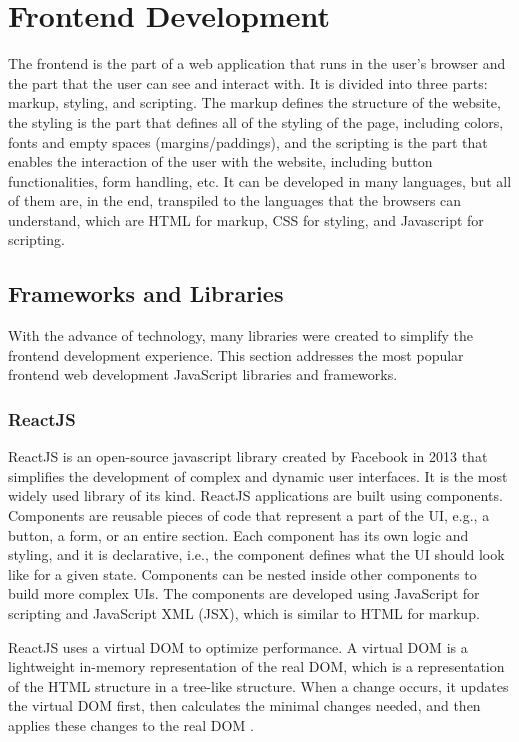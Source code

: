 \section{Frontend Development}
The frontend is the part of a web application that runs in the user's browser and
the part that the user can see and interact with. It is divided into three
parts: markup, styling, and scripting.
The markup defines the structure of the website, the styling is the part that
defines all of the styling of the page, including colors, fonts and empty spaces
(margins/paddings), and the scripting is the part that enables the interaction
of the user with the website, including button functionalities, form handling,
etc.
It can be developed in many languages, but all of them are, in the end, transpiled
to the languages that the browsers can understand, which are \gls{HTML} for
markup, \gls{CSS} for styling, and Javascript for scripting.

\subsection{Frameworks and Libraries}
With the advance of technology, many libraries were created to simplify the
frontend development experience. This section addresses the most popular
frontend web development JavaScript libraries and frameworks.
\subsubsection{ReactJS}
ReactJS is an open-source javascript library created by Facebook in 2013 that
simplifies the development of complex and dynamic user interfaces. It is the most widely
used library of its kind.
ReactJS applications are built using components. Components are reusable pieces of
code that represent a part of the \gls{UI}, e.g., a button, a form, or an entire section.
Each component has its own logic and styling, and it is declarative, i.e., the
component defines what the \gls{UI} should look like for a given state.
Components can be nested inside other components to build more complex \gls{UI}s.
The components are developed using JavaScript for scripting and JavaScript \gls{XML} (\gls{JSX}),
which is similar to \gls{HTML} for markup.

ReactJS uses a virtual \gls{DOM} to optimize performance. A virtual
\gls{DOM} is a lightweight in-memory representation of the real \gls{DOM}, which is a
representation of the \gls{HTML} structure in a tree-like structure. When a change
occurs, it updates the virtual \gls{DOM} first, then calculates the minimal changes needed,
and then applies these changes to the real \gls{DOM} \cite{bawane2022review}.

